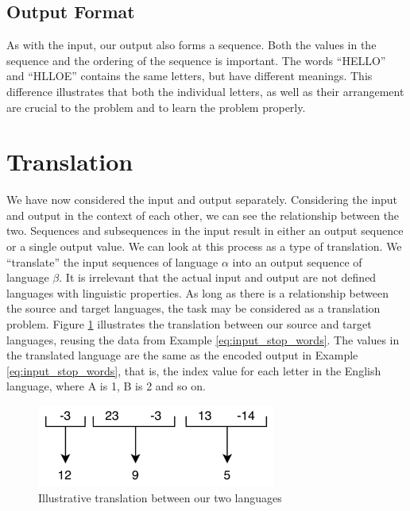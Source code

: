 \subsection{Output Format}
As with the input, our output also forms a sequence. Both the values in the sequence and the ordering of the sequence is important. The words ``HELLO'' and ``HLLOE'' contains the same letters, but have different meanings. This difference illustrates that both the individual letters, as well as their arrangement are crucial to the problem and to learn the problem properly. 


\section{Translation}
\label{sec:translation}
We have now considered the input and output separately. Considering the input and output in the context of each other, we can see the relationship between the two. Sequences and subsequences in the input result in either an output sequence or a single output value. We can look at this process as a type of translation. We ``translate'' the input sequences of language \(\alpha\) into an output sequence of language \(\beta\). It is irrelevant that the actual input and output are not defined languages with linguistic properties. As long as there is a relationship between the source and target languages, the task may be considered as a translation problem. Figure \ref{fig:number_translation} illustrates the translation between our source and target languages, reusing the data from Example \ref{eq:input_stop_words}. The values in the translated language are the same as the encoded output in Example \ref{eq:input_stop_words}, that is, the index value for each letter in the English language, where A is 1, B is 2 and so on.

\begin{figure}[ht]
    \centering
    \includegraphics[width=0.7\textwidth]{fig/background_theory/number_translation.png}
    \caption{Illustrative translation between our two languages}
    \label{fig:number_translation}
\end{figure}

